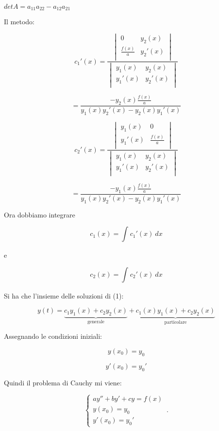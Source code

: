 \documentclass[11pt]{article}
\begin{document}
$det A = a_{11} a_{22} - a_{12} a_{21}$

Il metodo:

\[
c_1'(x) = 
    \frac{
\begin{vmatrix}
0 & y_2(x)  \\
\frac{f(x)}{a} & y_2'(x)  \\
\end{vmatrix}
    }{
\begin{vmatrix}
y_1(x) & y_2(x)  \\
y_1'(x) & y_2'(x)  \\
\end{vmatrix}
    }
\]

\[
    = \frac{- y_2(x) \frac{f(x)}{a}}{y_1(x) y_2'(x) - y_2(x) y_1'(x)}
\]

\[
c_2'(x) = 
    \frac{
\begin{vmatrix}
y_1(x) & 0  \\
y_1'(x) & \frac{f(x)}{a}  \\
\end{vmatrix}
    }{
\begin{vmatrix}
y_1(x) & y_2(x)  \\
y_1'(x) & y_2'(x)  \\
\end{vmatrix}
    }
\]

\[
    = \frac{- y_1(x) \frac{f(x)}{a}}{y_1(x) y_2'(x) - y_2(x) y_1'(x)}
\]

Ora dobbiamo integrare

\[
    c_1(x) = \int_{}^{} {c_1'(x)} \: dx 
\]

e

\[
    c_2(x) = \int_{}^{} {c_2'(x)} \: dx 
\]

Si ha che l'insieme delle soluzioni di (1):

\[
    y(t)  = \underbrace{c_1 y_1(x) + c_2 y_2(x)}_\text{generale} + \underbrace{c_1(x) y_1(x) + c_2 y_2(x)}_\text{particolare}
\]

Assegnando le condizioni iniziali: 

\[
    y(x_0) = y_0
\]

\[
    y'(x_0) = y_0'
\]

Quindi il problema di Cauchy mi viene:

    \begin{equation}
        \begin{cases}
            ay''+ by'+cy= f(x)\\
            y(x_0)=y_0\\
            y'(x_0) = y_0'
        \end{cases}\,.
    \end{equation}
\end{document}
